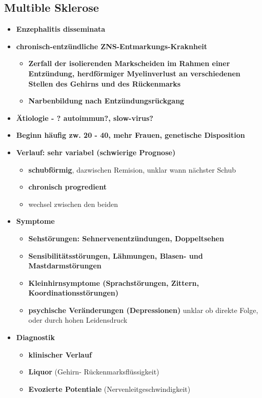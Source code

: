 \subsection{Multible Sklerose}
	\begin{itemize}
		\item \textbf{Enzephalitis disseminata}
		\item \textbf{chronisch-entzündliche ZNS-Entmarkungs-Kraknheit}
			\begin{itemize}
				\item \textbf{Zerfall der isolierenden Markscheiden im Rahmen einer Entzündung, herdförmiger Myelinverlust an verschiedenen Stellen des Gehirns und des Rückenmarks}
				\item \textbf{Narbenbildung nach Entzündungsrückgang}
			\end{itemize}
		\item \textbf{Ätiologie - ? autoimmun?, slow-virus?}
		\item \textbf{Beginn häufig zw. 20 - 40, mehr Frauen, genetische Disposition}
		\item \textbf{Verlauf: sehr variabel (schwierige Prognose)}
			\begin{itemize}
				\item \textbf{schubförmig}, dazwischen Remision, unklar wann nächster Schub
				\item \textbf{chronisch progredient}
				\item wechsel zwischen den beiden
			\end{itemize}
		\item \textbf{Symptome}
			\begin{itemize}
				\item \textbf{Sehstörungen: Sehnervenentzündungen, Doppeltsehen}
				\item \textbf{Sensibilitätsstörungen, Lähmungen, Blasen- und Mastdarmstörungen}
				\item \textbf{Kleinhirnsymptome (Sprachstörungen, Zittern, Koordinationsstörungen)}
				\item \textbf{psychische Veränderungen (Depressionen)} unklar ob direkte Folge, oder durch hohen Leidensdruck
			\end{itemize}
		\item \textbf{Diagnostik}
			\begin{itemize}
				\item \textbf{klinischer Verlauf}
				\item \textbf{Liquor} (Gehirn- Rückenmarksflüssigkeit)
				\item \textbf{Evozierte Potentiale} (Nervenleitgeschwindigkeit)

\end{itemize}
\end{itemize}
